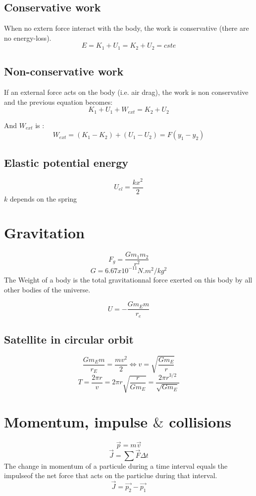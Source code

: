 \documentclass[a4paper,10pt]{article}
\begin{document}
\subsection{Conservative work}
When no extern force interact with the body, the work is conservative (there are no energy-loss).
\[E = K_1 + U_1 = K_2 + U_2 = cste \]

\subsection{Non-conservative work}
If an external force acts on the body (i.e. air drag), the work is non conservative and the previous equation becomes:
\[K_1 + U_1 + W_{ext} = K_2 + U_2\]

And $W_{ext}$ is :
\[W_{ext} = (K_1 - K_2) + (U_1 - U_2) = F(y_1 - y_2)\]

\subsection{Elastic potential energy}
\[U_{el} = \frac{kx^2}{2}\]
$k$ depends on the spring

\section{Gravitation}
\[F_g = \frac{Gm_1m_2}{r^2}\]
\[G = 6.67x10^{-11} N.m^2/kg^2\]
The Weight of a body is the total gravitationnal force exerted on this body by all other bodies of the universe.

\[U = -\frac{Gm_Em}{r_e}\]

\subsection{Satellite in circular orbit}
\[ \frac{Gm_Em}{r_E} = \frac{mv^2}{2} \Leftrightarrow v = \sqrt{\frac{Gm_E}{r}} \]
\[T = \frac{2\pi r}{v} = 2\pi r \sqrt{\frac{r}{Gm_E}} = \frac{2\pi r^{3/2}}{\sqrt{Gm_E}}\]

\section{Momentum, impulse $\&$ collisions}
\[\vec{p} = m\vec{v}\]
\[\vec{J} = \sum{} \vec{F}\Delta t\]
The change in momentum of a particule during a time interval equals the impulseof the net force that acts on the particlue during that interval.
\[\vec{J} = \vec{p_2} - \vec{p_1}\]
\end{document}
